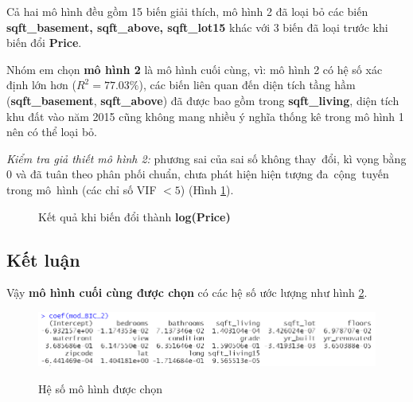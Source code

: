 Cả hai mô hình đều gồm 15 biến giải thích, mô hình 2 đã loại bỏ các biến \textbf{sqft\_basement, sqft\_above, sqft\_lot15} khác với 3 biến đã loại trước khi biến đổi \textbf{Price}. 

Nhóm em chọn \textbf{mô hình 2} là mô hình cuối cùng, vì: mô hình 2 có hệ số xác định lớn hơn ($R^2=77.03\%$), các biến liên quan đến diện tích tầng hầm (\textbf{sqft\_basement}, \textbf{sqft\_above}) đã được bao gồm trong \textbf{sqft\_living}, diện tích khu đất vào năm 2015 cũng không mang nhiều ý nghĩa thống kê trong mô hình 1 nên có thể loại bỏ.

\textit{Kiểm tra giả thiết mô hình 2:} phương sai của sai số không thay~đổi, kì vọng bằng 0 và đã tuân theo phân phối chuẩn, chưa phát hiện hiện tượng đa~cộng~tuyến trong mô~hình (các chỉ số VIF $< 5$) (Hình \ref{B2_final}). 

 \begin{figure}[h!]
	\centering
	\hfill
	\caption{Kết quả khi biến đổi thành \textbf{log(Price)}}
	\label{B2_final}
\end{figure}
\subsection*{Kết luận}
Vậy \textbf{mô hình cuối cùng được chọn} có các hệ số ước lượng như hình \ref{B2_coef}.
\begin{figure}[h!]
	\centering
	{\includegraphics[width=\linewidth]{../Photo Of Result/B2_coef}}
	\caption{Hệ số mô hình được chọn}
	\label{B2_coef}
\end{figure}

